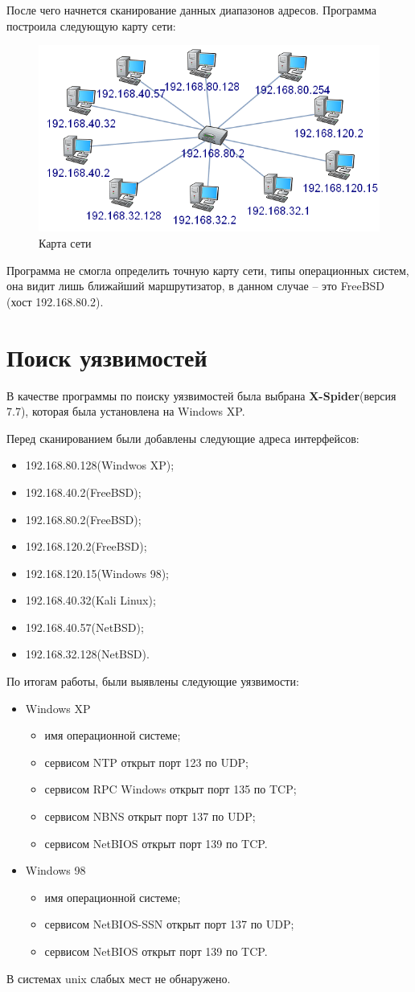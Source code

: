 \documentclass[14pt,a4paper,report]{report}
\begin{document}
После чего начнется сканирование данных диапазонов адресов. Программа построила следующую карту сети:
\begin{figure}[h]
  \centering
  \includegraphics[width=.7\textwidth]{img/3}
  \caption{Карта сети}
\end{figure}
Программа не смогла определить точную карту сети, типы операционных систем, она видит лишь ближайший маршрутизатор, в данном случае – это FreeBSD (хост 192.168.80.2).
\section{Поиск уязвимостей}
В качестве программы по поиску уязвимостей была выбрана \textbf{X-Spider}(версия 7.7), которая была установлена на Windows XP.

Перед сканированием были добавлены следующие адреса интерфейсов:

\begin{itemize}
\item 192.168.80.128(Windwos XP);
\item 192.168.40.2(FreeBSD);
\item 192.168.80.2(FreeBSD);
\item 192.168.120.2(FreeBSD);
\item 192.168.120.15(Windows 98);
\item 192.168.40.32(Kali Linux);
\item 192.168.40.57(NetBSD);
\item 192.168.32.128(NetBSD).
\end{itemize}


По итогам работы, были выявлены следующие уязвимости:
\begin{itemize}
\item Windows XP
\begin{itemize}
\item имя операционной системе;
\item сервисом NTP открыт порт 123 по UDP;
\item сервисом RPC Windows открыт порт 135 по TCP;
\item сервисом NBNS открыт порт 137 по UDP;
\item сервисом NetBIOS открыт порт 139 по TCP.
\end{itemize}
\item Windows 98
\begin{itemize}
\item имя операционной системе;
\item сервисом NetBIOS-SSN открыт порт 137 по UDP;
\item сервисом NetBIOS открыт порт 139 по TCP.
\end{itemize}
\end{itemize}
В системах unix слабых мест не обнаружено.
\end{document}
